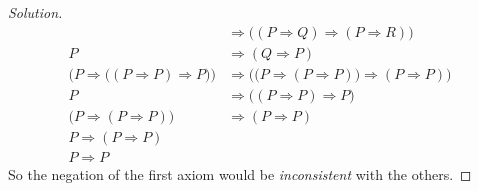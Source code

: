\documentclass{article}
\theoremstyle{normal}
\begin{document}
\begin{proof}[Solution]
\begin{align}
            &\Rightarrow\big((P\Rightarrow{Q})\Rightarrow(P\Rightarrow{R})\big)
                \tag{Axiom 3}\\
            P&\Rightarrow(Q\Rightarrow{P})
                \tag{Axiom 2}\\
            \Big(P\Rightarrow\big((P\Rightarrow{P})\Rightarrow{P}\big)\Big)
            &\Rightarrow\Big(\big(P\Rightarrow(P\Rightarrow{P})\big)
            \Rightarrow(P\Rightarrow{P})\Big)
                \tag{Substitute}\\
            P&\Rightarrow\big((P\Rightarrow{P})\Rightarrow{P}\big)
                \tag{Substitute}\\
            \big(P\Rightarrow(P\Rightarrow{P})\big)&\Rightarrow(P\Rightarrow{P})
                \tag{Modus Ponens}\\
            P\Rightarrow(P\Rightarrow{P})
                \tag{Axiom 2}\\
            P\Rightarrow{P}
                \tag{Modus Ponens}
        \end{align}
        So the negation of the first axiom would be \textit{inconsistent} with
        the others.
    \end{proof}
    \newpage
    \color{blue}
\end{document}
